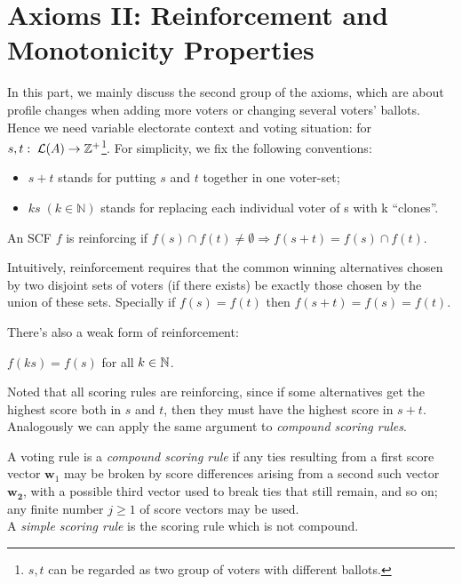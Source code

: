 \section{Axioms II: Reinforcement and Monotonicity Properties}

In this part, we mainly discuss the second group of the axioms, which are about profile changes when adding more voters or changing several voters' ballots. Hence we need variable electorate context and voting situation: for $s,t:\; \mathcal{L}(A) \to \mathbb{Z}^+$\footnote{$s,t$ can be regarded as two group of voters with different ballots.}. For simplicity, we fix the following conventions:
\begin{itemize}
    \item $s+t$ stands for putting $s$ and $t$ together in one voter-set;
    \item $ks\;(k \in \mathbb{N})$ stands for replacing each individual voter of s with k “clones”.
\end{itemize}

\begin{definition}
    An SCF $f$ is reinforcing if $f(s) \cap f(t) \neq \emptyset \Rightarrow f(s+t) = f(s) \cap f(t)$.
\end{definition}

Intuitively, reinforcement requires that the common winning alternatives chosen by two disjoint sets of voters (if there exists) be exactly those chosen by the union of these sets. Specially if $f(s) = f(t)$ then $f(s+t) = f(s) = f(t)$.

There's also a weak form of reinforcement:
\begin{definition}[Homogeneity]
    $f(ks) = f(s)$ for all $k \in \mathbb{N}$.
\end{definition}

Noted that all scoring rules are reinforcing, since if some alternatives get the highest score both in $s$ and $t$, then they must have the highest score in $s+t$. Analogously we can apply the same argument to \textit{compound scoring rules}.

\begin{definition}
    A voting rule is a \textit{compound scoring rule} if any ties resulting from a first score vector $\mathbf{w}_1$ may be broken by score differences arising from a second such vector $\mathbf{w_2}$, with a possible third vector used to break ties that still remain, and so on; any finite number $j \geq 1$ of score vectors may be used.\\
    A \textit{simple scoring rule} is the scoring rule which is not compound.
\end{definition}

